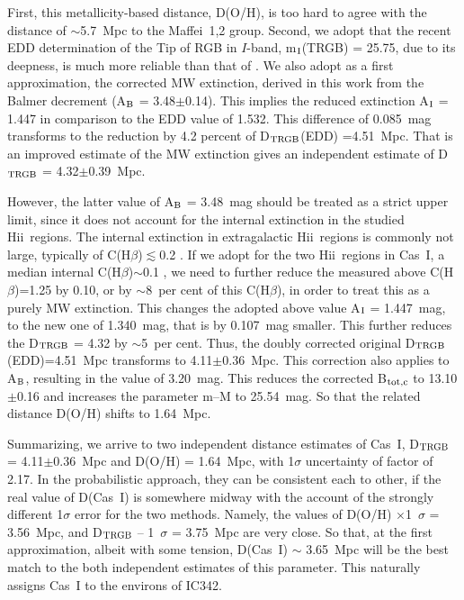 \documentclass[useAMS,usenatbib]{mn2e}
\newcommand{\HII}{H{\sc ii}}
\begin{document}
First, this metallicity-based distance, D(O/H), is too hard to agree with the distance of $\sim$5.7~Mpc
to the Maffei~1,2 group.
Second, we adopt that the recent EDD determination of the Tip of RGB in $I$-band, m$_{\rm I}$(TRGB) = 25.75,
due to its deepness, is much more reliable than that of \citet{Tikhonov19}.
We also adopt as a first approximation, the corrected MW extinction, derived in this work from the Balmer decrement
(A$_{\rm B}$ = 3.48$\pm$0.14). This implies the reduced extinction A$_{\rm I}$ = 1.447 in comparison to the EDD value
of 1.532.
This difference of 0.085~mag transforms to the reduction by 4.2 percent of D$_{\rm TRGB}$(EDD) =4.51~Mpc.
That is an improved  estimate of the MW extinction gives an independent estimate of D$_{\rm TRGB}$ = 4.32$\pm$0.39~Mpc.

However, the latter value of A$_{\rm B}$ = 3.48~mag should be treated as a strict upper limit, since it does not
account for the
internal extinction in the studied \HII\ regions. The internal extinction in extragalactic \HII\ regions is commonly not
large, typically of C(H$\beta$)$\lesssim$0.2 \citep[e.g.][]{Guseva17}. If we adopt for the two \HII\ regions
in Cas~I, a median internal C(H$\beta$)$\sim$0.1   \citep[as in][]{Guseva17},
we need to further reduce the measured above C(H$\beta$)=1.25 by 0.10, or by $\sim$8~per cent of this C(H$\beta$),
in order to treat this as a purely MW extinction.
This changes the adopted above value A$_{\rm I}$ = 1.447~mag, to the new one of 1.340~mag, that is by
0.107~mag smaller. This further reduces the D$_{\rm TRGB}$ = 4.32 by $\sim$5~per cent. Thus, the doubly corrected
original D$_{\rm TRGB}$(EDD)=4.51~Mpc  transforms to  4.11$\pm$0.36~Mpc.
This correction also applies to A$_{\rm B}$, resulting in the value of 3.20~mag. This reduces the corrected B$_{\rm tot,c}$
to 13.10$\pm$0.16 and increases the parameter m--M to 25.54~mag. So that the related distance D(O/H) shifts to 1.64~Mpc.

Summarizing, we arrive to two independent distance estimates of Cas~I, D$_{\rm TRGB}$ = 4.11$\pm$0.36~Mpc and
D(O/H) = 1.64~Mpc, with 1$\sigma$ uncertainty of factor of 2.17.
In the probabilistic approach, they can be consistent each to other, if the real value of D(Cas~I) is somewhere midway with
the account of the strongly different 1$\sigma$ error for the two methods. Namely, the values of
D(O/H) $\times$1~$\sigma$ = 3.56~Mpc, and D$_{\rm TRGB}$ -- 1~$\sigma$ = 3.75~Mpc are very close.
So that, at the first approximation, albeit with some tension, D(Cas~I) $\sim$ 3.65~Mpc will be the best match
to the both independent estimates of this parameter.
This naturally assigns Cas~I to the environs of IC342.
\end{document}
